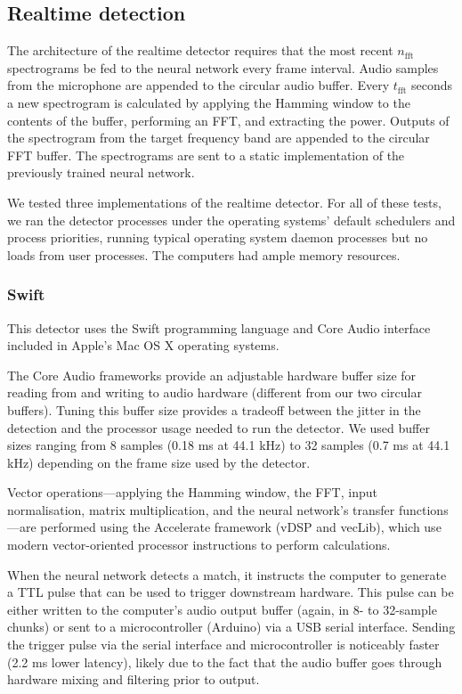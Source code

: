 \documentclass[10pt,letterpaper]{article}
\begin{document}
\subsection{Realtime detection}

The architecture of the realtime detector requires that the most
recent $n_\textrm{fft}$ spectrograms be fed to the neural network
every frame interval.  Audio samples from the microphone are appended
to the circular audio buffer.  Every $t_\textrm{fft}$ seconds a new
spectrogram is calculated by applying the Hamming window to the
contents of the buffer, performing an FFT, and extracting the
power. Outputs of the spectrogram from the target frequency band are
appended to the circular FFT buffer.  The spectrograms are sent to a
static implementation of the previously trained neural network.

We tested three implementations of the realtime detector.  For all of
these tests, we ran the detector processes under the operating
systems' default schedulers and process priorities, running typical
operating system daemon processes but no loads from user processes.
The computers had ample memory resources.

\subsubsection{Swift}

This detector uses the Swift programming language and Core Audio
interface included in Apple's Mac OS X operating systems.

The Core Audio frameworks provide an adjustable hardware buffer size
for reading from and writing to audio hardware (different from our two
circular buffers). Tuning this buffer size provides a tradeoff between
the jitter in the detection and the processor usage needed to run the
detector. We used buffer sizes ranging from 8 samples (0.18 ms at 44.1
kHz) to 32 samples (0.7 ms at 44.1 kHz) depending on the frame size 
used by the detector.

Vector operations---applying the Hamming window, the FFT, input
normalisation, matrix multiplication, and the neural network's
transfer functions---are performed using the Accelerate framework
(vDSP and vecLib), which use modern vector-oriented processor
instructions to perform calculations.

When the neural network detects a match, it instructs the computer to
generate a TTL pulse that can be used to trigger downstream hardware.
This pulse can be either written to the computer's audio output buffer
(again, in 8- to 32-sample chunks) or sent to a microcontroller
(Arduino) via a USB serial interface. Sending the trigger pulse via
the serial interface and microcontroller is noticeably faster (2.2 ms
lower latency), likely due to the fact that the audio buffer goes
through hardware mixing and filtering prior to output.
\end{document}
